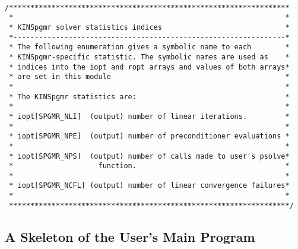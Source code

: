 \small
\begin{verbatim}

/******************************************************************
 *                                                                *
 * KINSpgmr solver statistics indices                             *
 *----------------------------------------------------------------*
 * The following enumeration gives a symbolic name to each        *
 * KINSpgmr-specific statistic. The symbolic names are used as    *
 * indices into the iopt and ropt arrays and values of both arrays*
 * are set in this module                                         *
 *                                                                *
 * The KINSpgmr statistics are:                                   *
 *                                                                *
 * iopt[SPGMR_NLI]  (output) number of linear iterations.         *
 *                                                                *
 * iopt[SPGMR_NPE]  (output) number of preconditioner evaluations *
 *                                                                *
 * iopt[SPGMR_NPS]  (output) number of calls made to user's psolve*
 *                    function.                                   *
 *                                                                *
 * iopt[SPGMR_NCFL] (output) number of linear convergence failures*
 *                                                                *
 ******************************************************************/
\end{verbatim}
\normalsize

\normalsize
\subsection{A Skeleton of the User's Main Program}

